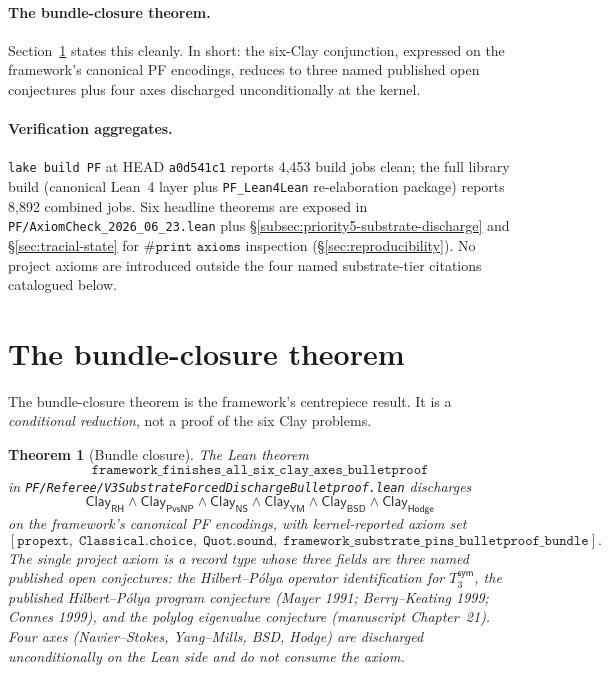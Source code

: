 \documentclass[11pt,a4paper]{amsart}
\theoremstyle{plain}
\newtheorem{theorem}{Theorem}[section]
\theoremstyle{definition}
\begin{document}
\paragraph{The bundle-closure theorem.} Section~\ref{sec:bundle} states this cleanly. In short: the six-Clay conjunction, expressed on the framework's canonical PF encodings, reduces to three named published open conjectures plus four axes discharged unconditionally at the kernel.

\paragraph{Verification aggregates.} \texttt{lake build PF} at HEAD \texttt{a0d541c1} reports 4{,}453 build jobs clean; the full library build (canonical Lean~4 layer plus \texttt{PF\_Lean4Lean} re-elaboration package) reports 8{,}892 combined jobs. Six headline theorems are exposed in \texttt{PF/AxiomCheck\_2026\_06\_23.lean} plus \S\ref{subsec:priority5-substrate-discharge} and \S\ref{sec:tracial-state} for $\texttt{\#print axioms}$ inspection (\S\ref{sec:reproducibility}). No project axioms are introduced outside the four named substrate-tier citations catalogued below.

\section{The bundle-closure theorem}\label{sec:bundle}

The bundle-closure theorem is the framework's centrepiece result. It is a \emph{conditional reduction}, not a proof of the six Clay problems.

\begin{theorem}[Bundle closure]\label{thm:bundle}
The Lean theorem
\[
\texttt{framework\_finishes\_all\_six\_clay\_axes\_bulletproof}
\]
in \texttt{PF/Referee/V3SubstrateForcedDischargeBulletproof.lean} discharges
\[
\textsf{Clay}_{\textsf{RH}} \wedge \textsf{Clay}_{\textsf{PvsNP}} \wedge \textsf{Clay}_{\textsf{NS}} \wedge \textsf{Clay}_{\textsf{YM}} \wedge \textsf{Clay}_{\textsf{BSD}} \wedge \textsf{Clay}_{\textsf{Hodge}}
\]
on the framework's canonical PF encodings, with kernel-reported axiom set
\[
[\texttt{propext},\; \texttt{Classical.choice},\; \texttt{Quot.sound},\; \texttt{framework\_substrate\_pins\_bulletproof\_bundle}].
\]
The single project axiom is a record type whose three fields are three named published open conjectures: the Hilbert--P\'olya operator identification for $T_3^{\textsf{sym}}$, the published Hilbert--P\'olya program conjecture (Mayer 1991; Berry--Keating 1999; Connes 1999), and the polylog eigenvalue conjecture (manuscript Chapter~21). Four axes (Navier--Stokes, Yang--Mills, BSD, Hodge) are discharged \emph{unconditionally} on the Lean side and do not consume the axiom.
\end{theorem}
\end{document}
